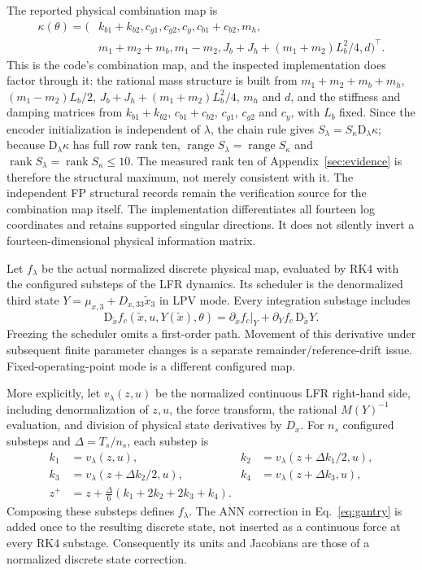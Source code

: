 \documentclass[11pt,a4paper]{article}
\newcommand{\D}{\mathrm D}
\newcommand{\ran}{\operatorname{range}}
\newcommand{\rank}{\operatorname{rank}}
\theoremstyle{remark}
\begin{document}
The reported physical combination map is
\begin{equation}\label{eq:combos}
 \begin{aligned}
 \kappa(\theta)=\big(&k_{b1}+k_{b2},c_{g1},c_{g2},c_y,c_{b1}+c_{b2},m_h,\\
 &m_1+m_2+m_b,m_1-m_2,J_b+J_h+(m_1+m_2)L_b^2/4,d\big)^\top.
 \end{aligned}
\end{equation}
This is the code's combination map, and the inspected implementation does factor through it: the rational mass structure is built from $m_1+m_2+m_b+m_h$, $(m_1-m_2)L_b/2$, $J_b+J_h+(m_1+m_2)L_b^2/4$, $m_h$ and $d$, and the stiffness and damping matrices from $k_{b1}+k_{b2}$, $c_{b1}+c_{b2}$, $c_{g1}$, $c_{g2}$ and $c_y$, with $L_b$ fixed. Since the encoder initialization is independent of $\lambda$, the chain rule gives $S_\lambda=S_\kappa\D_\lambda\kappa$; because $\D_\lambda\kappa$ has full row rank ten, $\ran S_\lambda=\ran S_\kappa$ and $\rank S_\lambda=\rank S_\kappa\le10$. The measured rank ten of Appendix~\ref{sec:evidence} is therefore the structural maximum, not merely consistent with it. The independent FP structural records remain the verification source for the combination map itself. The implementation differentiates all fourteen log coordinates and retains supported singular directions. It does not silently invert a fourteen-dimensional physical information matrix.

Let $f_\lambda$ be the actual normalized discrete physical map, evaluated by RK4 with the configured substeps of the LFR dynamics. Its scheduler is the denormalized third state $Y=\mu_{x,3}+D_{x,33}\tilde x_3$ in LPV mode. Every integration substage includes
\begin{equation}\label{eq:schedule}
 \D_{\tilde x} f_c(\tilde x,u,Y(\tilde x),\theta)
 =\partial_{\tilde x}f_c\big|_Y+\partial_Y f_c\,\D_{\tilde x}Y.
\end{equation}
Freezing the scheduler omits a first-order path. Movement of this derivative under subsequent finite parameter changes is a separate remainder/reference-drift issue. Fixed-operating-point mode is a different configured map.

More explicitly, let $v_\lambda(z,u)$ be the normalized continuous LFR right-hand side, including denormalization of $z,u$, the force transform, the rational $M(Y)^{-1}$ evaluation, and division of physical state derivatives by $D_x$. For $n_s$ configured substeps and $\Delta=T_s/n_s$, each substep is
\begin{align}
 k_1&=v_\lambda(z,u),& k_2&=v_\lambda(z+\Delta k_1/2,u),\nonumber\\
 k_3&=v_\lambda(z+\Delta k_2/2,u),& k_4&=v_\lambda(z+\Delta k_3,u),\nonumber\\
 z^+&=z+\tfrac{\Delta}{6}(k_1+2k_2+2k_3+k_4).\label{eq:rk4}
\end{align}
Composing these substeps defines $f_\lambda$. The ANN correction in Eq.~\eqref{eq:gantry} is added once to the resulting discrete state, not inserted as a continuous force at every RK4 substage. Consequently its units and Jacobians are those of a normalized discrete state correction.
\end{document}
